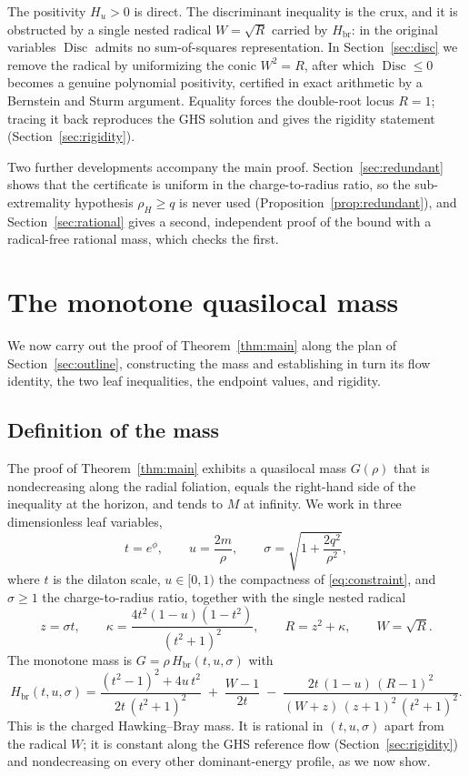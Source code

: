 \documentclass[11pt]{article}
\theoremstyle{plain}
\theoremstyle{definition}
\newcommand{\rH}{\rho_{\!H}}
\newcommand{\Hbr}{H_{\mathrm{br}}}
\newcommand{\Disc}{\operatorname{Disc}}
\begin{document}
The positivity $H_u>0$ is direct. The discriminant inequality is the crux, and it is obstructed by a single
nested radical $W=\sqrt R$ carried by $\Hbr$: in the original variables $\Disc$ admits no sum-of-squares
representation. In Section~\ref{sec:disc} we remove the radical by uniformizing the conic $W^2=R$, after which
$\Disc\le0$ becomes a genuine polynomial positivity, certified in exact arithmetic by a Bernstein and Sturm
argument. Equality forces the double-root locus $R=1$; tracing it back reproduces the GHS solution and gives
the rigidity statement (Section~\ref{sec:rigidity}).

Two further developments accompany the main proof. Section~\ref{sec:redundant} shows that the certificate is
uniform in the charge-to-radius ratio, so the sub-extremality hypothesis $\rH\ge q$ is never used
(Proposition~\ref{prop:redundant}), and Section~\ref{sec:rational} gives a second, independent proof of the
bound with a radical-free rational mass, which checks the first.

\section{The monotone quasilocal mass}\label{sec:mass}

We now carry out the proof of Theorem~\ref{thm:main} along the plan of Section~\ref{sec:outline}, constructing
the mass and establishing in turn its flow identity, the two leaf inequalities, the endpoint values, and rigidity.

\subsection{Definition of the mass}\label{sec:massdef}

The proof of Theorem~\ref{thm:main} exhibits a quasilocal mass $G(\rho)$ that is nondecreasing along the
radial foliation, equals the right-hand side of the inequality at the horizon, and tends to $M$ at infinity.
We work in three dimensionless leaf variables,
\begin{equation}\label{eq:vars}
  t=e^{\phi},\qquad u=\frac{2m}{\rho},\qquad \sigma=\sqrt{1+\frac{2q^2}{\rho^2}},
\end{equation}
where $t$ is the dilaton scale, $u\in[0,1)$ the compactness of \eqref{eq:constraint}, and $\sigma\ge1$ the
charge-to-radius ratio, together with the single nested radical
\begin{equation}\label{eq:W}
  z=\sigma t,\qquad \kappa=\frac{4t^2(1-u)(1-t^2)}{(t^2+1)^2},\qquad R=z^2+\kappa,\qquad W=\sqrt{R}.
\end{equation}
The monotone mass is $G=\rho\,\Hbr(t,u,\sigma)$ with
\begin{equation}\label{eq:Hbr}
  \Hbr(t,u,\sigma)
  =\frac{(t^2-1)^2+4u\,t^2}{2t\,(t^2+1)^2}
  \;+\;\frac{W-1}{2t}
  \;-\;\frac{2t\,(1-u)\,(R-1)^2}{(W+z)\,(z+1)^2\,(t^2+1)^2}.
\end{equation}
This is the charged Hawking--Bray mass. It is rational in $(t,u,\sigma)$ apart from the radical $W$; it is
constant along the GHS reference flow (Section~\ref{sec:rigidity}) and nondecreasing on every other
dominant-energy profile, as we now show.
\end{document}
